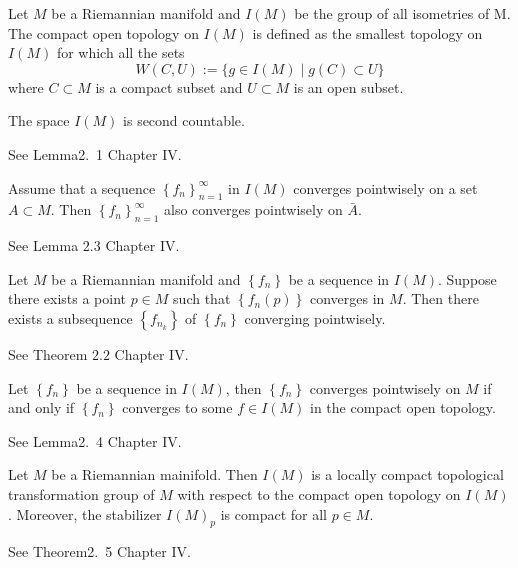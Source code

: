 \begin{definition}
	Let $M$ be a Riemannian manifold and $I(M)$ be the group of
	all isometries of
	M. The compact open topology on $I(M)$ is defined as the
	smallest topology on $I(M)$ for which all the sets
	\[
	W(C, U):=\{ g \in I(M) \mid g (C) \subset U \}
	\]
	where $C \subset M$ is a compact subset and $U \subset M$ is
	an open subset.
\end{definition}
\begin{lemma}
	The space $I(M) $ is second countable.
\end{lemma}
\bproof
See \cite{Hel} Lemma2.\ 1 Chapter IV.
\eproof
\begin{lemma}
	Assume that a sequence $\left\{ f_{n}
	\right\}_{n=1}^{\infty}$ in $I(M)$ converges pointwisely on a
	set $A \subset M$. Then $\left\{ f_{n}
	\right\}_{n=1}^{\infty}$ also converges pointwisely on
	$\bar{A}$.
\end{lemma}
\bproof
See \cite{Hel} Lemma $2.3$ Chapter IV.
\eproof
\begin{lemma}
	Let $M$ be a Riemannian manifold and $\left\{ f_{n} \right\}$
	be a sequence in $I(M) .$ Suppose there exists a point $p \in
	M$ such that $\left\{ f_{n} (p) \right\}$ converges in $M$.
	Then there exists a subsequence $\left\{f_{n_{k}}\right\}$ of
	$\left\{f_{n}\right\}$ converging pointwisely.
\end{lemma}
\bproof
See \cite{Hel} Theorem $2.2$ Chapter IV.
\eproof
\begin{theorem}
	Let $\left\{ f_{n} \right\}$ be a sequence in $I(M)$, then
	$\left\{ f_{n} \right\}$ converges pointwisely on $M$ if and
	only if $\left\{ f_{n} \right\}$ converges to some $f \in I(M)$
	in the compact open topology.
\end{theorem}
\bproof
See \cite{Hel} Lemma2.\ 4 Chapter IV.
\eproof
\begin{theorem}
	Let $M$ be a Riemannian mainifold. Then $I(M)$ is a locally
	compact topological
	transformation group of $M$ with respect to the compact open
	topology on $I(M)$. Moreover, the stabilizer  $I(M)_p$  is
	compact for all $p \in M$.
\end{theorem}
\bproof
See \cite{Hel} Theorem2.\ 5 Chapter IV.
\eproof